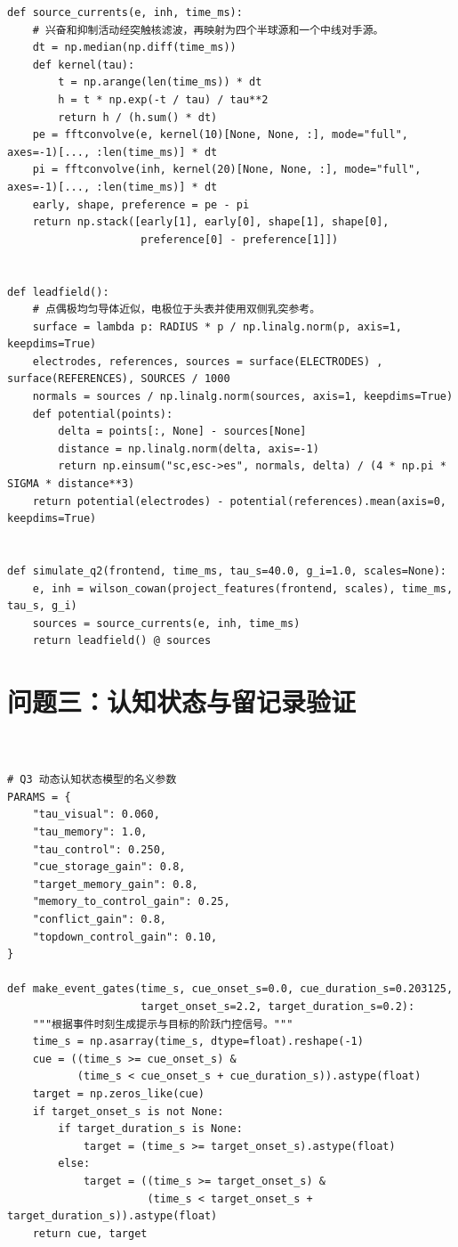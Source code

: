 \begin{appendices}
\begin{lstlisting}[style=appendixPython]
def source_currents(e, inh, time_ms):
    # 兴奋和抑制活动经突触核滤波，再映射为四个半球源和一个中线对手源。
    dt = np.median(np.diff(time_ms))
    def kernel(tau):
        t = np.arange(len(time_ms)) * dt
        h = t * np.exp(-t / tau) / tau**2
        return h / (h.sum() * dt)
    pe = fftconvolve(e, kernel(10)[None, None, :], mode="full", axes=-1)[..., :len(time_ms)] * dt
    pi = fftconvolve(inh, kernel(20)[None, None, :], mode="full", axes=-1)[..., :len(time_ms)] * dt
    early, shape, preference = pe - pi
    return np.stack([early[1], early[0], shape[1], shape[0],
                     preference[0] - preference[1]])


def leadfield():
    # 点偶极均匀导体近似，电极位于头表并使用双侧乳突参考。
    surface = lambda p: RADIUS * p / np.linalg.norm(p, axis=1, keepdims=True)
    electrodes, references, sources = surface(ELECTRODES) , surface(REFERENCES), SOURCES / 1000
    normals = sources / np.linalg.norm(sources, axis=1, keepdims=True)
    def potential(points):
        delta = points[:, None] - sources[None]
        distance = np.linalg.norm(delta, axis=-1)
        return np.einsum("sc,esc->es", normals, delta) / (4 * np.pi * SIGMA * distance**3)
    return potential(electrodes) - potential(references).mean(axis=0, keepdims=True)


def simulate_q2(frontend, time_ms, tau_s=40.0, g_i=1.0, scales=None):
    e, inh = wilson_cowan(project_features(frontend, scales), time_ms, tau_s, g_i)
    sources = source_currents(e, inh, time_ms)
    return leadfield() @ sources

\end{lstlisting}

\clearpage
\section{问题三：认知状态与留记录验证}
\begin{lstlisting}[style=appendixPython]


# Q3 动态认知状态模型的名义参数
PARAMS = {
    "tau_visual": 0.060,
    "tau_memory": 1.0,
    "tau_control": 0.250,
    "cue_storage_gain": 0.8,
    "target_memory_gain": 0.8,
    "memory_to_control_gain": 0.25,
    "conflict_gain": 0.8,
    "topdown_control_gain": 0.10,
}

def make_event_gates(time_s, cue_onset_s=0.0, cue_duration_s=0.203125,
                     target_onset_s=2.2, target_duration_s=0.2):
    """根据事件时刻生成提示与目标的阶跃门控信号。"""
    time_s = np.asarray(time_s, dtype=float).reshape(-1)
    cue = ((time_s >= cue_onset_s) &
           (time_s < cue_onset_s + cue_duration_s)).astype(float)
    target = np.zeros_like(cue)
    if target_onset_s is not None:
        if target_duration_s is None:
            target = (time_s >= target_onset_s).astype(float)
        else:
            target = ((time_s >= target_onset_s) &
                      (time_s < target_onset_s + target_duration_s)).astype(float)
    return cue, target


\end{lstlisting}
\end{appendices}
